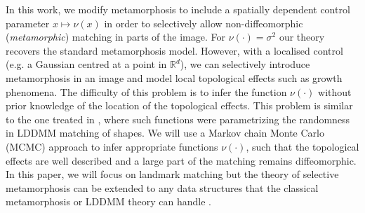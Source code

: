 \documentclass[runningheads]{llncs}
\newcommand{\Rd}{\mathbb{R}^{d}}
\begin{document}
In this work, we modify metamorphosis to include a spatially dependent control
parameter $x\mapsto\nu(x)$ in order to selectively allow non-diffeomorphic
(\emph{metamorphic}) matching in parts of the image. For $\nu(\cdot) = \sigma^2$
our theory recovers the standard metamorphosis model. However, with a localised
control (e.g. a Gaussian centred at a point in $\Rd$), we can selectively
introduce metamorphosis in an image and model local topological effects such as
growth phenomena. The difficulty of this problem is to infer the function
$\nu(\cdot)$ without prior knowledge of the location of the topological effects.
This problem is similar to the one treated in \cite{arnaudon_geometric_2017}, where 
such functions were parametrizing the randomness in LDDMM  matching of shapes. 
We will use a Markov chain Monte Carlo (MCMC) approach to infer appropriate
functions $\nu(\cdot)$, such that the topological effects are well described and
a large part of the matching remains diffeomorphic. In this paper, we will focus
on landmark matching but the theory of selective metamorphosis can be extended
to any data structures that the classical metamorphosis or LDDMM theory can
handle \cite{bockarnaudoncotter2019}.\\
\end{document}
